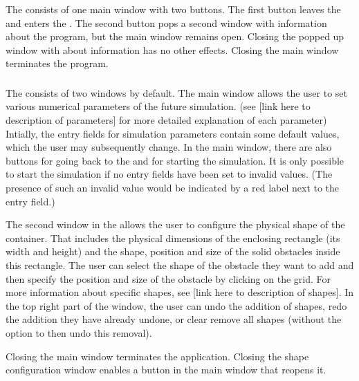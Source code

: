 \documentclass{article}
\newcommand{\vxlisp}{\vspace*{12pt}}
\begin{document}
\subsubsection{\Inull}\label{sec:i0}
The \inull{} consists of one main window with two buttons. The first button leaves the \inull{} and enters the \ione. The second button pops a second window with information about the program, but the main window remains open. Closing the popped up window with about information has no other effects. Closing the main window terminates the program.


\subsubsection{\Ione}\label{sec:i1}

The \ione{} consists of two windows by default. The main window allows the user to set various numerical parameters of the future simulation. (see [link here to description of parameters] for more detailed explanation of each parameter) Intially, the entry fields for simulation parameters contain some default values, which the user may subsequently change. In the main window, there are also buttons for going back to the \inull{} and for starting the simulation. It is only possible to start the simulation if no entry fields have been set to invalid values. (The presence of such an invalid value would be indicated by a red label next to the entry field.)
\vxlisp

The second window in the \ione{} allows the user to configure the physical shape of the container. That includes the physical dimensions of the enclosing rectangle (its width and height) and the shape, position and size of the solid obstacles inside this rectangle. The user can select the shape of the obstacle they want to add and then specify the position and size of the obstacle by clicking on the grid. For more information about specific shapes, see [link here to description of shapes]. In the top right part of the window, the user can undo the addition of shapes, redo the addition they have already undone, or clear remove all shapes (without the option to then undo this removal).
\vxlisp

Closing the main window terminates the application. Closing the shape configuration window enables a button in the main window that reopens it.

\subsubsection{\Itwo}\label{sec:i2}
\end{document}
